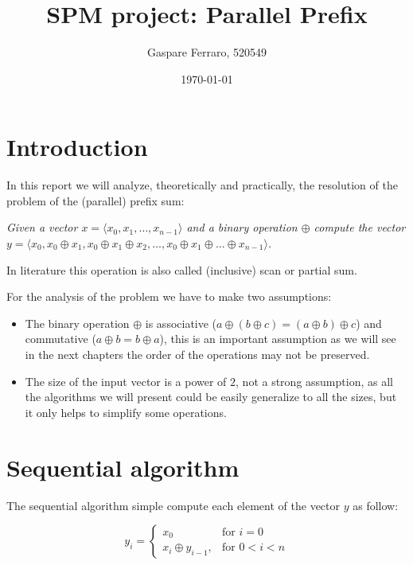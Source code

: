 \documentclass{article}
\title{SPM project: Parallel Prefix}
\author{Gaspare Ferraro, 520549}
\affil{Master Degree in Computer Science - University of Pisa}
\affil[]{ferraro@gaspa.re}
\date{\today}
\newcommand{\for}{\text{for }}
\begin{document}
 
\maketitle
 
\section{Introduction}

In this report we will analyze, theoretically and practically, the resolution of the problem of the (parallel) prefix sum:

\medskip

\textit{Given a vector $x = \langle x_{0}, x_{1}, \ldots, x_{n-1} \rangle$ and a binary operation $\oplus$ compute the vector $y = \langle x_{0}, x_{0} \oplus x_{1}, x_{0} \oplus x_{1} \oplus x_{2}, \ldots, x_{0} \oplus x_{1} \oplus \ldots \oplus x_{n-1} \rangle$.} %

\medskip

In literature this operation is also called (inclusive) scan or partial sum.

\medskip

For the analysis of the problem we have to make two assumptions:

\begin{itemize}
  \item The binary operation $\oplus$ is associative ($ a \oplus ( b \oplus c ) =  (a \oplus b) \oplus c  $) and commutative ($a \oplus b = b \oplus a$), this is an important assumption as we will see in the next chapters the order of the operations may not be preserved.
  \item The size of the input vector is a power of $2$, not a strong assumption, as all the algorithms we will present could be easily generalize to all the sizes, but it only helps to simplify some operations.
\end{itemize}

\section{Sequential algorithm}

The sequential algorithm simple compute each element of the vector $y$ as follow:

\begin{equation*}[]
    y_{i} =
    \begin{cases}
      x_{0}& \for i = 0 \\
      x_{i} \oplus y_{i-1},& \for 0 <  i < n
    \end{cases}
\end{equation*}
\end{document}
